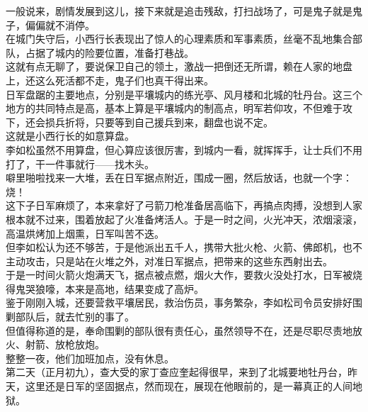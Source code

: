 \begin{multicols}{\theparacolNo}
一般说来，剧情发展到这儿，接下来就是追击残敌，打扫战场了，可是鬼子就是鬼子，偏偏就不消停。\\

在城门失守后，小西行长表现出了惊人的心理素质和军事素质，丝毫不乱地集合部队，占据了城内的险要位置，准备打巷战。\\

这就有点无聊了，要说保卫自己的领土，激战一把倒还无所谓，赖在人家的地盘上，还这么死活都不走，鬼子们也真干得出来。\\

日军盘踞的主要地点，分别是平壤城内的练光亭、风月楼和北城的牡丹台。这三个地方的共同特点是高，基本上算是平壤城内的制高点，明军若仰攻，不但难于攻下，还会损兵折将，只要等到自己援兵到来，翻盘也说不定。\\

这就是小西行长的如意算盘。\\

李如松虽然不用算盘，但心算应该很厉害，到城内一看，就挥挥手，让士兵们不用打了，干一件事就行——找木头。\\

噼里啪啦找来一大堆，丢在日军据点附近，围成一圈，然后放话，也就一个字：烧！\\

这下子日军麻烦了，本来拿好了弓箭刀枪准备居高临下，再搞点肉搏，没想到人家根本就不过来，围着放起了火准备烤活人。于是一时之间，火光冲天，浓烟滚滚，高温烘烤加上烟熏，日军叫苦不迭。\\

但李如松认为还不够苦，于是他派出五千人，携带大批火枪、火箭、佛郎机，也不主动攻击，只是站在火堆之外，对准日军据点，把带来的这些东西射出去。\\

于是一时间火箭火炮满天飞，据点被点燃，烟火大作，要救火没处打水，日军被烧得鬼哭狼嚎，本来是高地，结果变成了高炉。\\

鉴于刚刚入城，还要营救平壤居民，救治伤员，事务繁杂，李如松司令员安排好围剿部队后，就去忙别的事了。\\

但值得称道的是，奉命围剿的部队很有责任心，虽然领导不在，还是尽职尽责地放火、射箭、放枪放炮。\\

整整一夜，他们加班加点，没有休息。\\

第二天（正月初九），查大受的家丁查应奎起得很早，来到了北城要地牡丹台，昨天，这里还是日军的坚固据点，然而现在，展现在他眼前的，是一幕真正的人间地狱。\\


\end{multicols}
